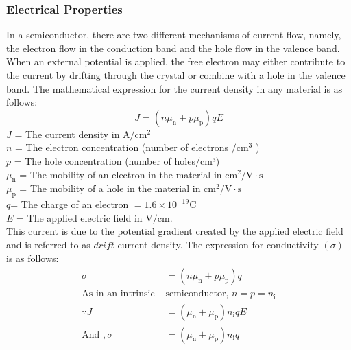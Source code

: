 \subsubsection{Electrical Properties}
In a semiconductor, there are two different mechanisms of current flow, namely, the electron flow in the conduction band and the hole flow in the valence band. When an external potential is applied, the free electron may either contribute to the current by drifting through the crystal or combine with a hole in the valence band. The mathematical expression for the current density in any material is as follows:
\begin{equation}
J=\left(n \mu_{\mathrm{n}}+p \mu_{\mathrm{p}}\right) q E
\end{equation}
$J$ = The current density in $\mathrm{A} / \mathrm{cm}^{2} $\\
$n$ = The electron concentration (number of electrons $/ \mathrm{cm}^{3}$ )\\ $p$ = The hole concentration (number of holes/cm³)\\ $\mu_{\mathrm{n}}$ = The mobility of an electron in the material in $\mathrm{cm}^{2} / \mathrm{V} \cdot \mathrm{s}$\\ $ \mu_{\mathrm{p}}$ =  The mobility of a hole in the material in $\mathrm{cm}^{2} / \mathrm{V} \cdot \mathrm{s}$\\ $q$= The charge of an electron $=1.6 \times 10^{-19} \mathrm{C}$ \\$E$ = The applied electric field in $\mathrm{V} / \mathrm{cm}$.\\
This current is due to the potential gradient created by the applied electric field and is referred to as $d r i f t$ current density. The expression for conductivity $(\sigma)$ is as follows:
\begin{align}
\sigma&=\left(n \mu_{\mathrm{n}}+p \mu_{\mathrm{p}}\right) q\\
\text{As in an intrinsic }&\text{semiconductor, $n=p=n_{\mathrm{i}}$} \\
\because J&=\left(\mu_{\mathrm{n}}+\mu_{\mathrm{p}}\right) n_{\mathrm{i}} q E  \\
\text{And }, \sigma&=\left(\mu_{\mathrm{n}}+\mu_{\mathrm{p}}\right) n_{\mathrm{i}} q
\end{align}
